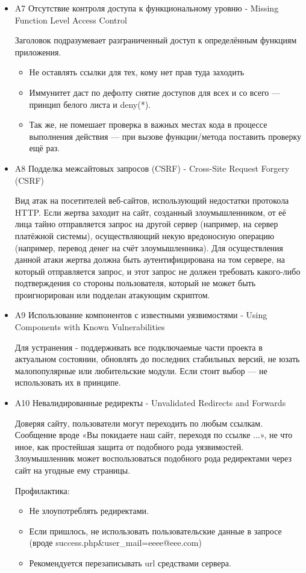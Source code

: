\documentclass[11pt, a4paper]{article}		%
\begin{document}
\begin{itemize}
\item A7 Отсутствие контроля доступа к функциональному уровню - Missing Function Level Access Control

Заголовок подразумевает разграниченный доступ к определённым функциям приложения.
\begin{itemize}
\item Не оставлять ссылки для тех, кому нет прав туда заходить
\item Иммунитет даст по дефолту снятие доступов для всех и со всего — принцип белого листа и deny(*).
\item Так же, не помешает проверка в важных местах кода в процессе выполнения действия — при вызове функции/метода поставить проверку ещё раз.
\end{itemize}

\item A8 Подделка межсайтовых запросов (CSRF) - Cross-Site Request Forgery (CSRF)

Вид атак на посетителей веб-сайтов, использующий недостатки протокола HTTP. Если жертва заходит на сайт, созданный злоумышленником, от её лица тайно отправляется запрос на другой сервер (например, на сервер платёжной системы), осуществляющий некую вредоносную операцию (например, перевод денег на счёт злоумышленника). Для осуществления данной атаки жертва должна быть аутентифицирована на том сервере, на который отправляется запрос, и этот запрос не должен требовать какого-либо подтверждения со стороны пользователя, который не может быть проигнорирован или подделан атакующим скриптом.

\item A9 Использование компонентов с известными уязвимостями - Using Components with Known Vulnerabilities

Для устранения - поддерживать все подключаемые части проекта в актуальном состоянии, обновлять до последних стабильных версий, не юзать малопопулярные или любительские модули. Если стоит выбор — не использовать их в принципе.

\item A10 Невалидированные редиректы - Unvalidated Redirects and Forwards

Доверяя сайту, пользователи могут переходить по любым ссылкам. Сообщение вроде «Вы покидаете наш сайт, переходя по ссылке ...», не что иное, как простейшая защита от подобного рода уязвимостей. Злоумышленник может воспользоваться подобного рода редиректами через сайт на угодные ему страницы.

Профилактика:

\begin{itemize}
\item Не злоупотреблять редиректами.
\item Если пришлось, не использовать пользовательские данные в запросе (вроде success.php\&user\_mail=eeee@eee.com)
\item Рекомендуется перезаписывать url средствами сервера.
\end{itemize}


\end{itemize}
\end{document}
